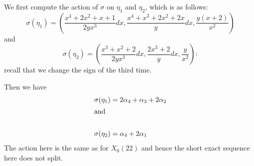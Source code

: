 \documentclass[draft, 11pt]{article} %
\theoremstyle{plain}
\theoremstyle{remark}
\begin{document}
We first compute the action of $\sigma$ on $\eta_1$ and $\eta_2$, which is as follows:
\[
\sigma(\eta_1) = \left( \frac{x^4 + 2x^2 + x +1}{2yx^3}dx, \frac{x^4 + x^3 + 2x^2 + 2x}{y}dx, \frac{y(x+2)}{x^2} \right) 
\]
and
\[
\sigma(\eta_2) = \left( \frac{x^3 + x^2 +2}{2yx^3}dx, \frac{2x^3 + 2}{y}dx, \frac{y}{x^2} \right):
\]
recall that we change the sign of the third time.

Then we have
\begin{align*}
\sigma(\eta_1) &= 2\alpha_4 + \alpha_3 + 2\alpha_2\\
\intertext{and}\\
\sigma(\eta_2) & = \alpha_4 + 2\alpha_1
\end{align*}
The action here is the same as for $X_0(22)$ and hence the short exact sequence here does not split.





\end{document}

